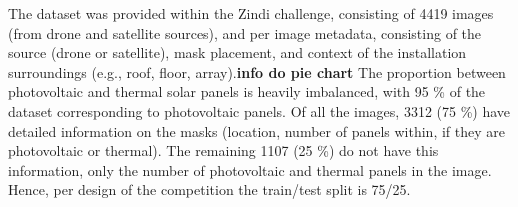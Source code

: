 \documentclass[conference]{IEEEtran}
\begin{document}
The dataset was provided within the Zindi challenge, consisting of 4419 images (from drone and satellite sources), and per image metadata, consisting of the source (drone or satellite), mask placement, and context of the installation surroundings (e.g., roof, floor, array).\textbf{info do pie chart} The proportion between photovoltaic and thermal solar panels is heavily imbalanced, with 95 \% of the dataset corresponding to photovoltaic panels.
Of all the images, 3312 (75 \%) have detailed information on the masks (location, number of panels within, if they are photovoltaic or thermal). The remaining 1107 (25 \%) do not have this information, only the number of photovoltaic and thermal panels in the image. Hence, per design of the competition the train/test split is 75/25.

\end{document}
